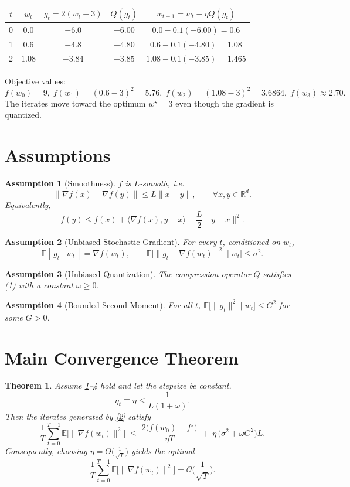 \documentclass{article}
\newtheorem{theorem}{Theorem}
\newtheorem{assumption}{Assumption}
\begin{document}
\begin{center}
\begin{tabular}{c|c|c|c|c}
$t$ & $w_{t}$ & $g_{t}=2(w_{t}-3)$ & $Q(g_{t})$ & $w_{t+1}=w_{t}-\eta Q(g_{t})$ \\ \hline
0 & $0.0$ & $-6.0$ & $-6.00$ & $0.0-0.1(-6.00)=0.6$ \\
1 & $0.6$ & $-4.8$ & $-4.80$ & $0.6-0.1(-4.80)=1.08$ \\
2 & $1.08$ & $-3.84$ & $-3.85$ & $1.08-0.1(-3.85)=1.465$ \\
\end{tabular}
\end{center}
Objective values:
\[
f(w_{0})=9,\; f(w_{1})=(0.6-3)^{2}=5.76,\; f(w_{2})=(1.08-3)^{2}=3.6864,\; f(w_{3})\approx2.70.
\]
The iterates move toward the optimum $w^{\star}=3$ even though the gradient is quantized.

\newpage
\section*{Assumptions}
\begin{assumption}[Smoothness]\label{ass:smooth}
$f$ is $L$‑smooth, i.e.
\[
\|\nabla f(x)-\nabla f(y)\|\le L\|x-y\|,\qquad\forall x,y\in\mathbb{R}^{d}.
\tag{3}
\]
Equivalently,
\[
f(y)\le f(x)+\langle\nabla f(x),y-x\rangle+\frac{L}{2}\|y-x\|^{2}.
\tag{4}
\]
\end{assumption}
\begin{assumption}[Unbiased Stochastic Gradient]\label{ass:sgd}
For every $t$, conditioned on $w_{t}$,
\[
\mathbb{E}[\,g_{t}\mid w_{t}\,]=\nabla f(w_{t}),\qquad 
\mathbb{E}\big[\|g_{t}-\nabla f(w_{t})\|^{2}\mid w_{t}\big]\le\sigma^{2}.
\tag{5}
\]
\end{assumption}
\begin{assumption}[Unbiased Quantization]\label{ass:quant}
The compression operator $Q$ satisfies (1) with a constant $\omega\ge0$.
\end{assumption}
\begin{assumption}[Bounded Second Moment]\label{ass:bound}
For all $t$, $\mathbb{E}\big[\|g_{t}\|^{2}\mid w_{t}\big]\le G^{2}$ for some $G>0$.
\end{assumption}

\section*{Main Convergence Theorem}
\begin{theorem}\label{thm:main}
Assume \ref{ass:smooth}–\ref{ass:bound} hold and let the stepsize be constant,
\[
\eta_{t}\equiv\eta\le \frac{1}{L(1+\omega)} .
\tag{6}
\]
Then the iterates generated by \eqref{2} satisfy
\[
\frac{1}{T}\sum_{t=0}^{T-1}\mathbb{E}\big[\|\nabla f(w_{t})\|^{2}\big]
\;\le\;
\frac{2\big(f(w_{0})-f^{\star}\big)}{\eta T}
\;+\;
\eta\,\big(\sigma^{2}+ \omega G^{2}\big)L .
\tag{7}
\]
Consequently, choosing $\eta =\Theta\!\big(\tfrac{1}{\sqrt{T}}\big)$ yields the optimal
\[
\frac{1}{T}\sum_{t=0}^{T-1}\mathbb{E}\big[\|\nabla f(w_{t})\|^{2}\big]=\mathcal{O}\!\Big(\frac{1}{\sqrt{T}}\Big).
\tag{8}
\]
\end{theorem}
\end{document}
